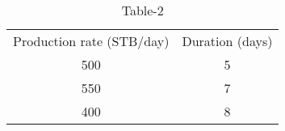 \begin{table}[H]
    \centering
    \begin{tabular}{c|c}
      Production rate (STB/day)   &  Duration (days) \\
       500  & 5\\
       550 & 7\\
       400 & 8
    \end{tabular}
    \caption{Table-2}
    \label{tab:tables/table2.tex}
\end{table}